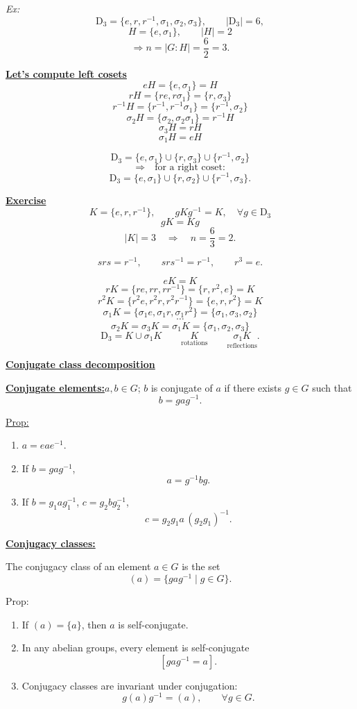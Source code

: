 \documentclass[11pt,a4paper]{article}
\newcommand{\rednote}[1]{\textcolor{noteRed}{#1}}
\newcommand{\D}{\mathrm{D}}
\begin{document}
\emph{Ex:}
\[
\D_3=\{e,r,r^{-1},\sigma_1,\sigma_2,\sigma_3\},\qquad |\D_3|=6,
\]
\[
H=\{e,\sigma_1\},\qquad |H|=2
\]
\[
\Longrightarrow n=|G:H|=\frac{6}{2}=3.
\]

\underline{\textbf{Let's compute left cosets}}
\[
eH=\{e,\sigma_1\}=H
\]
\[
rH=\{re,r\sigma_1\}=\{r,\sigma_3\}
\]
\[
r^{-1}H=\{r^{-1},r^{-1}\sigma_1\}=\{r^{-1},\sigma_2\}
\]
\[
\sigma_2H=\{\sigma_2,\sigma_2\sigma_1\}=r^{-1}H
\]
\[
\sigma_3H=rH
\]
\[
\sigma_1H=eH
\]

\[
\D_3=\{e,\sigma_1\}\cup\{r,\sigma_3\}\cup\{r^{-1},\sigma_2\}
\]
\[
\Longrightarrow\quad\text{for a right coset:}
\]
\[
\D_3=\{e,\sigma_1\}\cup\{r,\sigma_2\}\cup\{r^{-1},\sigma_3\}.
\]

\underline{\textbf{Exercise}}
\[
K=\{e,r,r^{-1}\},
\qquad
gKg^{-1}=K,\quad\forall g\in\D_3
\]
\[
gK=Kg
\]
\[
|K|=3\quad\Longrightarrow\quad n=\frac{6}{3}=2.
\]

\[
srs=r^{-1},\qquad srs^{-1}=r^{-1},\qquad r^3=e.
\]

\[
eK=K
\]
\[
rK=\{re,rr,rr^{-1}\}=\{r,r^2,e\}=K
\]
\[
r^2K=\{r^2e,r^2r,r^2r^{-1}\}=\{e,r,r^2\}=K
\]
\[
\sigma_1K=\{\sigma_1e,\sigma_1r,\sigma_1r^2\}
=\{\sigma_1,\sigma_3,\sigma_2\}
\]
\[
\cdots
\]
\[
\sigma_2K=\sigma_3K=\sigma_1K=\{\sigma_1,\sigma_2,\sigma_3\}
\]
\[
\D_3=K\cup\sigma_1K
\qquad
\underset{\text{rotations}}{K}\qquad
\underset{\text{reflections}}{\sigma_1K}.
\]

\underline{\textbf{Conjugate class decomposition}}

\underline{\textbf{Conjugate elements:}}\quad $a,b\in G$; $b$ is conjugate of $a$ if there exists $g\in G$ such that
\[
b=gag^{-1}.
\]

\underline{Prop:}
\begin{enumerate}
\item $a=eae^{-1}$.

\item If $b=gag^{-1}$,
\[
a=g^{-1}bg.
\]

\item If $b=g_1ag_1^{-1}$, $c=g_2bg_2^{-1}$,
\[
c=g_2g_1a\,(g_2g_1)^{-1}.
\]
\end{enumerate}

\underline{\textbf{Conjugacy classes:}}

The conjugacy class of an element $a\in G$ is the set
\[
(a)=\{gag^{-1}\mid g\in G\}.
\]

\rednote{Prop:}
\begin{enumerate}
\item If $(a)=\{a\}$, then $a$ is self-conjugate.

\item In any abelian groups, every element is self-conjugate
\[
[gag^{-1}=a].
\]

\item Conjugacy classes are invariant under conjugation:
\[
g(a)g^{-1}=(a),\qquad\forall g\in G.
\]
\end{enumerate}
\end{document}
